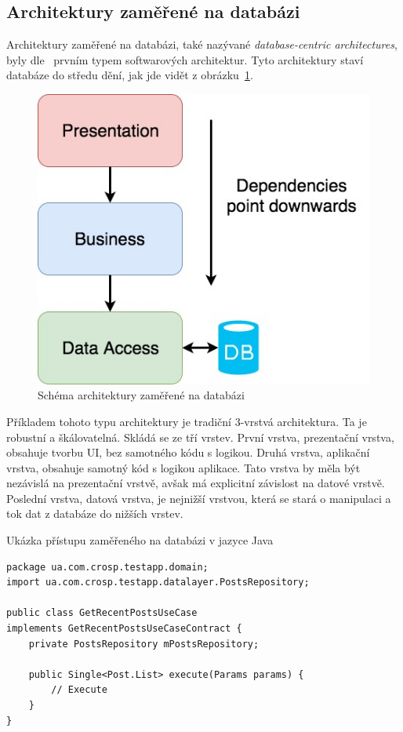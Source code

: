 \subsection{Architektury zaměřené na databázi}

Architektury zaměřené na databázi,
také nazývané \emph{database-centric architectures},
byly dle~\cite{architecture} prvním typem softwarových architektur.
Tyto architektury staví databáze do středu dění,
jak jde vidět z obrázku~\ref{fig:architecture_database}.

\begin{figure}
    \centering
    \includegraphics[width=0.5\linewidth]{assets/technology-research/architecture/database-centric.jpg}
    \caption{Schéma architektury zaměřené na databázi ~\cite{architecture}}
    \label{fig:architecture_database}
\end{figure}

Příkladem tohoto typu architektury je tradiční 3-vrstvá architektura.
Ta je robustní a škálovatelná.
Skládá se ze tří vrstev.
První vrstva,
prezentační vrstva,
obsahuje tvorbu UI,
bez samotného kódu s logikou.
Druhá vrstva,
aplikační vrstva,
obsahuje samotný kód s logikou aplikace.
Tato vrstva by měla být nezávislá na prezentační vrstvě,
avšak má explicitní závislost na datové vrstvě.
Poslední vrstva,
datová vrstva,
je nejnižší vrstvou,
která se stará o manipulaci a tok dat z databáze do nižších vrstev.
\cite{architecture}

\begin{listing}
    \caption{Ukázka přístupu zaměřeného na databázi v jazyce Java~\cite{architecture}}
    \label{code:architecture-database}
    \begin{verbatim}
package ua.com.crosp.testapp.domain;
import ua.com.crosp.testapp.datalayer.PostsRepository;

public class GetRecentPostsUseCase
implements GetRecentPostsUseCaseContract {
    private PostsRepository mPostsRepository;

    public Single<Post.List> execute(Params params) {
        // Execute
    }
}
    \end{verbatim}
\end{listing}

